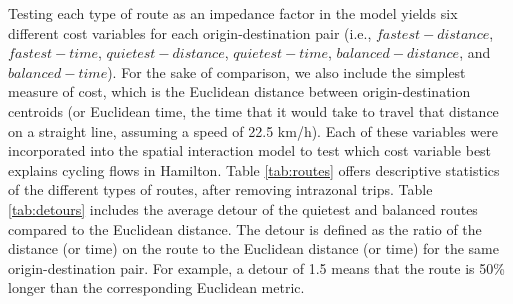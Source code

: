 \documentclass[smallextended]{svjour3}       %
\begin{document}
Testing each type of route as an impedance factor in the model yields
six different cost variables for each origin-destination pair (i.e.,
\(fastest-distance\), \(fastest-time\), \(quietest-distance\),
\(quietest-time\), \(balanced-distance\), and \(balanced-time\)). For
the sake of comparison, we also include the simplest measure of cost,
which is the Euclidean distance between origin-destination centroids (or
Euclidean time, the time that it would take to travel that distance on a
straight line, assuming a speed of 22.5 km/h). Each of these variables
were incorporated into the spatial interaction model to test which cost
variable best explains cycling flows in Hamilton. Table \ref{tab:routes}
offers descriptive statistics of the different types of routes, after
removing intrazonal trips. Table \ref{tab:detours} includes the average
detour of the quietest and balanced routes compared to the Euclidean
distance. The detour is defined as the ratio of the distance (or time)
on the route to the Euclidean distance (or time) for the same
origin-destination pair. For example, a detour of 1.5 means that the
route is 50\% longer than the corresponding Euclidean metric.
\end{document}
